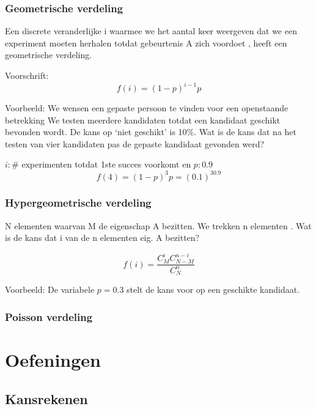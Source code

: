 \documentclass[12pt]{report}
\newcommand{\todo}[1]{
  {\color{red}\textunderscore{\textit{TODO: #1}}}
}
\newcommand{\example}[2]{
      \hrulefill
      
      Voorbeeld: #1
      
      #2
      
      \hrulefill
  }
\begin{document}
\section{Geometrische verdeling}
Een discrete veranderlijke 
i
waarmee we het 
aantal keer
weergeven dat  we een experiment 
moeten herhalen 
totdat gebeurtenis A zich 
voordoet
, heeft een 
geometrische verdeling.

Voorschrift:
$$f(i) = (1 - p)^{i - 1}p$$
\example{
    We wensen een gepaste persoon te vinden voor een 
    openstaande betrekking
    We testen meerdere kandidaten totdat een kandidaat 
    geschikt bevonden wordt.
    De kans op ‘niet geschikt’ is 10\%.
    Wat is de kans dat na het testen van vier kandidaten pas 
    de gepaste kandidaat gevonden werd?
}{
    $i : \#$ experimenten totdat 1ste succes voorkomt en $p: 0.9$
    $$f(4) = (1 - p)^3p = (0.1)^30.9$$
}

\section{Hypergeometrische verdeling}
N elementen waarvan M de eigenschap A bezitten.
We trekken n elementen .
Wat is de kans dat i van de n elementen eig. A bezitten?

$$f(i) = \frac{C_M^iC_{N - M}^{n - i}}{C_N^n}$$

\example{ 
    De variabele $p = 0.3$ stelt de kans voor op een geschikte kandidaat. 
}{
\todo{todo}
}

\section{Poisson verdeling}
\todo{todo}

\part{Oefeningen}
\chapter{Kansrekenen}
  
\end{document}
